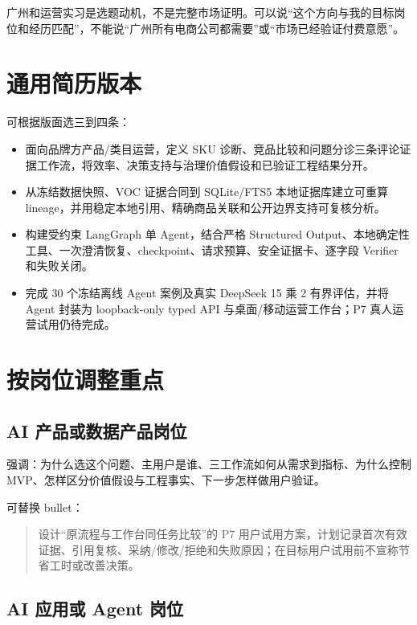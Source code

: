 \begin{boundarybox}
广州和运营实习是选题动机，不是完整市场证明。可以说“这个方向与我的目标岗位和经历匹配”，不能说“广州所有电商公司都需要”或“市场已经验证付费意愿”。
\end{boundarybox}

\section{通用简历版本}

可根据版面选三到四条：

\begin{itemize}
  \item 面向品牌方产品/类目运营，定义 SKU 诊断、竞品比较和问题分诊三条评论证据工作流，将效率、决策支持与治理价值假设和已验证工程结果分开。
  \item 从冻结数据快照、VOC 证据合同到 SQLite/FTS5 本地证据库建立可重算 lineage，并用稳定本地引用、精确商品关联和公开边界支持可复核分析。
  \item 构建受约束 LangGraph 单 Agent，结合严格 Structured Output、本地确定性工具、一次澄清恢复、checkpoint、请求预算、安全证据卡、逐字段 Verifier 和失败关闭。
  \item 完成 30 个冻结离线 Agent 案例及真实 DeepSeek 15 乘 2 有界评估，并将 Agent 封装为 loopback-only typed API 与桌面/移动运营工作台；P7 真人运营试用仍待完成。
\end{itemize}

\section{按岗位调整重点}

\subsection{AI 产品或数据产品岗位}

强调：为什么选这个问题、主用户是谁、三工作流如何从需求到指标、为什么控制 MVP、怎样区分价值假设与工程事实、下一步怎样做用户验证。

可替换 bullet：

\begin{quote}
设计“原流程与工作台同任务比较”的 P7 用户试用方案，计划记录首次有效证据、引用复核、采纳/修改/拒绝和失败原因；在目标用户试用前不宣称节省工时或改善决策。
\end{quote}

\subsection{AI 应用或 Agent 岗位}

